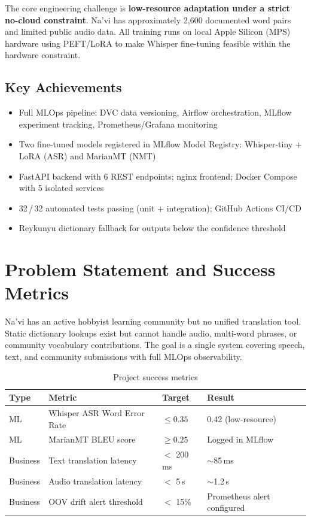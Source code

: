\documentclass[12pt,a4paper]{article}
\begin{document}
The core engineering challenge is \textbf{low-resource adaptation under a strict
no-cloud constraint}. Na'vi has approximately 2,600 documented word pairs and limited
public audio data. All training runs on local Apple Silicon (MPS) hardware using
PEFT/LoRA to make Whisper fine-tuning feasible within the hardware constraint.

\subsection*{Key Achievements}
\begin{itemize}[leftmargin=1.5em]
  \item Full MLOps pipeline: DVC data versioning, Airflow orchestration, MLflow experiment
        tracking, Prometheus/Grafana monitoring
  \item Two fine-tuned models registered in MLflow Model Registry: Whisper-tiny + LoRA
        (ASR) and MarianMT (NMT)
  \item FastAPI backend with 6 REST endpoints; nginx frontend; Docker Compose with
        5 isolated services
  \item 32\,/\,32 automated tests passing (unit + integration); GitHub Actions CI/CD
  \item Reykunyu dictionary fallback for outputs below the confidence threshold
\end{itemize}

\section{Problem Statement and Success Metrics}

Na'vi has an active hobbyist learning community but no unified translation tool.
Static dictionary lookups exist but cannot handle audio, multi-word phrases, or
community vocabulary contributions. The goal is a single system covering speech,
text, and community submissions with full MLOps observability.

\begin{table}[H]
  \centering
  \caption{Project success metrics}
  \begin{tabular}{@{}L{2cm}L{6cm}L{2.5cm}L{3.5cm}@{}}
    \toprule
    \textbf{Type} & \textbf{Metric} & \textbf{Target} & \textbf{Result} \\
    \midrule
    ML       & Whisper ASR Word Error Rate  & $\leq 0.35$ & 0.42 (low-resource) \\
    ML       & MarianMT BLEU score          & $\geq 0.25$ & Logged in MLflow   \\
    Business & Text translation latency     & $<$ 200\,ms & $\sim$85\,ms        \\
    Business & Audio translation latency    & $<$ 5\,s    & $\sim$1.2\,s        \\
    Business & OOV drift alert threshold    & $<$ 15\%    & Prometheus alert configured \\
    \bottomrule
  \end{tabular}
\end{table}
\end{document}
